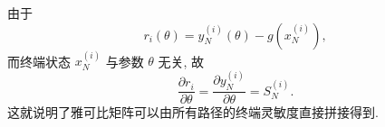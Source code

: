     由于
    \begin{equation*}
      r_{i}(\theta) = y_{N}^{(i)}(\theta) - g(x_{N}^{(i)}),
    \end{equation*}
    而终端状态 $x_{N}^{(i)}$ 与参数 $\theta$ 无关, 故
    \begin{equation*}
      \frac{\partial r_{i}}{\partial \theta}
      = \frac{\partial y_{N}^{(i)}}{\partial \theta}
      = S_{N}^{(i)}.
    \end{equation*}
    这就说明了雅可比矩阵可以由所有路径的终端灵敏度直接拼接得到.
